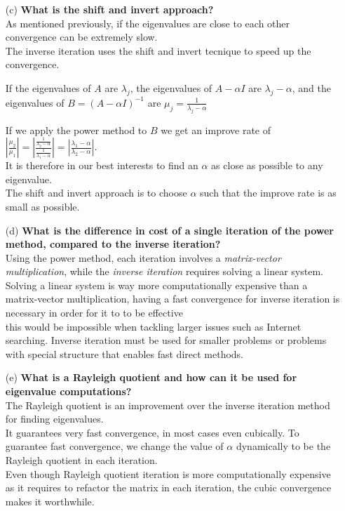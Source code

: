 \documentclass[unicode,11pt,a4paper,oneside,numbers=endperiod,openany]{scrartcl}
\begin{document}
\begin{enumerate}
\item[(c)] \textbf{What is the shift and invert approach?}\\
As mentioned previously, if the eigenvalues are close to each other convergence can be extremely slow.\\
The inverse iteration uses the shift and invert tecnique to speed up the convergence.

If the eigenvalues of $A$ are $\lambda_j$, the eigenvalues of $A -\alpha I$ are $\lambda_j - \alpha$, 
and the eigenvalues of $B = (A-\alpha I)^{-1}$ are $\mu_j = \frac{1}{\lambda_j - \alpha}$

If we apply the power method to $B$ we get an improve rate of $|\frac{\mu_2}{\mu_1}| = |\frac{\frac{1}{\lambda_2 - \alpha}}{\frac{1}{\lambda_1 - \alpha}}| = |\frac{\lambda_1 - \alpha}{\lambda_2 - \alpha}|$.\\
It is therefore in our best interests to find an $\alpha$ as close as possible to any eigenvalue.\\
The shift and invert approach is to choose $\alpha$ such that the improve rate is as small as possible.


\item[(d)] \textbf{What is the difference in cost of a single iteration of the power method, compared to the inverse iteration?}\\
Using the power method, each iteration involves a \textit{matrix-vector multiplication}, while the \textit{inverse iteration} requires solving a linear system.
Solving a linear system is way more computationally expensive than a matrix-vector multiplication, having a fast convergence for inverse iteration is necessary in order for it to to be effective\\
this would be impossible when tackling larger issues such as Internet searching.
Inverse iteration must be used for smaller problems or problems with special structure that enables fast direct methods.


\item[(e)] \textbf{What is a Rayleigh quotient and how can it be used for eigenvalue computations?}\\
The Rayleigh quotient is an improvement over the inverse iteration method for finding eigenvalues.\\
It guarantees very fast convergence, in most cases even cubically. To guarantee fast convergence, we change the value of $\alpha$ dynamically to be the Rayleigh quotient in each iteration.\\
Even though Rayleigh quotient iteration is more computationally expensive as it requires to refactor the matrix in each iteration, the cubic convergence makes it worthwhile.

\end{enumerate}
\end{document}
